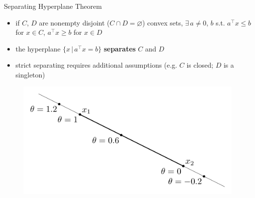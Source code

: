 \documentclass[10pt]{beamer}
\newcommand{\ds}{\displaystyle}
\theoremstyle{definition}
\begin{document}
\begin{frame}{Separating Hyperplane Theorem}
\begin{itemize}
  \item if $C$, $D$ are nonempty disjoint ($C\cap D=\varnothing$) convex sets, $\exists\,a\ne 0$, $b$ s.t. $\ds a^\top x\leqslant b$ for $x\in C$, $a^\top x\geqslant b$ for $x\in D$ 
  \item the hyperplane $\ds\{x\,|\,a^\top x = b\}$ {\bf separates} $C$ and $D$
  \item strict separating requires additional assumptions (e.g. $C$ is closed; $D$ is a singleton)
\end{itemize}
\begin{figure}[!htbp]
  \centering
  \includegraphics[scale=0.91,page=18]{fig/note06/02.pdf}
\end{figure}

\end{frame}
\end{document}

